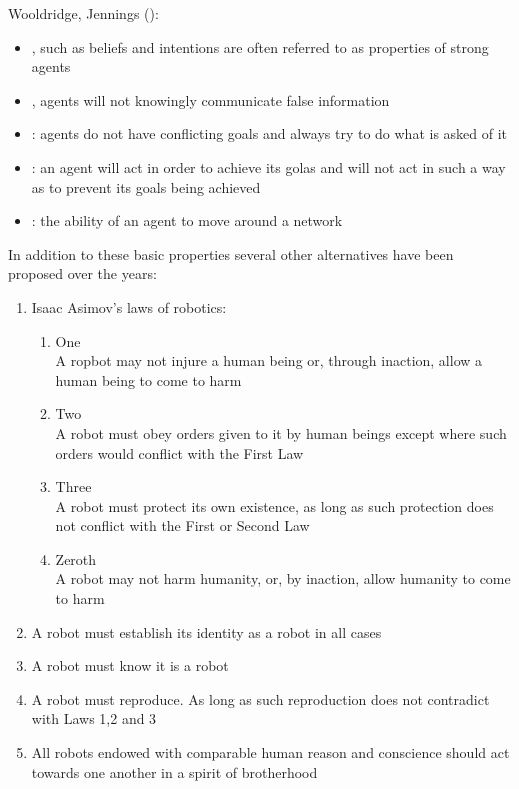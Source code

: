 Wooldridge, Jennings ():\\
\begin{itemize}
\item {}, such as beliefs and intentions are often referred to as properties of strong agents
\item {}, agents will not knowingly communicate false information
\item {}: agents do not have conflicting goals and always try to do what is asked of it
\item {}: an agent will act in order to achieve its golas and will not act in such a way as to prevent its goals being achieved
\item {}: the ability of an agent to move around a network
\end{itemize}

In addition to these basic properties several other alternatives have been proposed over the years:
\begin{enumerate}
\item Isaac Asimov's laws of robotics:
\begin{enumerate}[label={Law}]
\item One\\
A ropbot may not injure a human being or, through inaction, allow a human being to come to harm
\item Two\\
A robot must obey orders given to it by human beings except where such orders would conflict with the First Law
\item Three\\
A robot must protect its own existence, as long as such protection does not conflict with the First or Second Law
\item Zeroth\\
A robot may not harm humanity, or, by inaction, allow humanity to come to harm
\end{enumerate}
\item A robot must establish its identity as a robot in all cases
\item A robot must know it is a robot
\item A robot must reproduce. As long as such reproduction does not contradict with Laws 1,2 and 3
\item All robots endowed with comparable human reason and conscience should act towards one another in a spirit of brotherhood
\end{enumerate}

